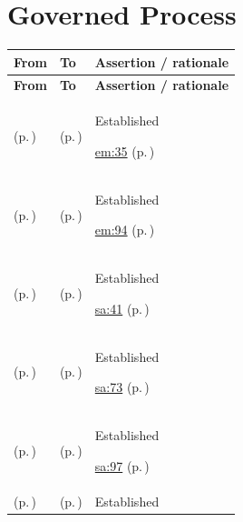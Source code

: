 \section{Governed Process}
\begingroup\small\setlength{\TableWidth}{\dimexpr\linewidth-6\tabcolsep-4\arrayrulewidth\relax}
\begin{longtable}{|>{\raggedright\arraybackslash}p{0.27\TableWidth}|>{\raggedright\arraybackslash}p{0.27\TableWidth}|>{\raggedright\arraybackslash}p{0.46\TableWidth}|}
\hline\rowcolor{TableHead}\textbf{From} & \textbf{To} & \textbf{Assertion / rationale}\\\hline\endfirsthead
\hline\rowcolor{TableHead}\textbf{From} & \textbf{To} & \textbf{Assertion / rationale}\\\hline\endhead
\hline\endfoot
\nameref{function:apply-governed-person-identity-correction} (p.\,\pageref{function:apply-governed-person-identity-correction}) & \nameref{process:governed-person-identity-correction-process} (p.\,\pageref{process:governed-person-identity-correction-process}) & Established

 \hyperref[rad:em:16]{em:35} (p.\,\pageref{rad:em:16})\\\hline
\nameref{function:verify-practitioner-registration} (p.\,\pageref{function:verify-practitioner-registration}) & \nameref{process:practitioner-verification-process} (p.\,\pageref{process:practitioner-verification-process}) & Established

 \hyperref[rad:em:86]{em:94} (p.\,\pageref{rad:em:86})\\\hline
\nameref{function:manage-referral-progression} (p.\,\pageref{function:manage-referral-progression}) & \nameref{process:referral-progression-process} (p.\,\pageref{process:referral-progression-process}) & Established

 \hyperref[rad:sa:28]{sa:41} (p.\,\pageref{rad:sa:28})\\\hline
\nameref{function:progress-encounter-state} (p.\,\pageref{function:progress-encounter-state}) & \nameref{process:encounter-lifecycle-process} (p.\,\pageref{process:encounter-lifecycle-process}) & Established

 \hyperref[rad:sa:63]{sa:73} (p.\,\pageref{rad:sa:63})\\\hline
\nameref{function:manage-order-progression} (p.\,\pageref{function:manage-order-progression}) & \nameref{process:closed-loop-order-progression-process} (p.\,\pageref{process:closed-loop-order-progression-process}) & Established

 \hyperref[rad:sa:83]{sa:97} (p.\,\pageref{rad:sa:83})\\\hline
\nameref{function:govern-clinical-document-lifecycle} (p.\,\pageref{function:govern-clinical-document-lifecycle}) & \nameref{process:clinical-document-lifecycle-process} (p.\,\pageref{process:clinical-document-lifecycle-process}) & Established


\end{longtable}
